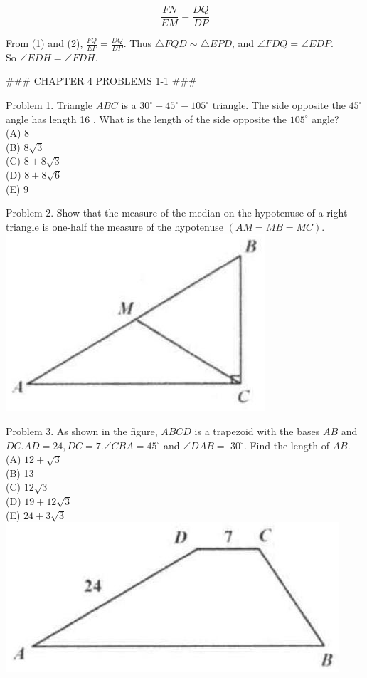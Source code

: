 \documentclass[10pt]{article}
\begin{document}
\[
\frac{F N}{E M}=\frac{D Q}{D P}
\]

From (1) and (2), \(\frac{F Q}{E P}=\frac{D Q}{D P}\). Thus \(\triangle F Q D \sim \triangle E P D\), and \(\angle F D Q=\angle E D P\).\\
So \(\angle E D H=\angle F D H\).


### CHAPTER 4 PROBLEMS 1-1 ###

Problem 1. Triangle \(A B C\) is a \(30^{\circ}-45^{\circ}-105^{\circ}\) triangle. The side opposite the \(45^{\circ}\) angle has length 16 . What is the length of the side opposite the \(105^{\circ}\) angle?\\
(A) 8\\
(B) \(8 \sqrt{3}\)\\
(C) \(8+8 \sqrt{3}\)\\
(D) \(8+8 \sqrt{6}\)\\
(E) 9

Problem 2. Show that the measure of the median on the hypotenuse of a right triangle is one-half the measure of the hypotenuse \((A M=M B=M C)\).\\
\includegraphics[max width=\textwidth, center]{2025_04_17_97bc1f7e44d93c271a88g-088(3)}

Problem 3. As shown in the figure, \(A B C D\) is a trapezoid with the bases \(A B\) and \(D C . A D=24, D C=7 . \angle C B A=45^{\circ}\) and \(\angle D A B=\) \(30^{\circ}\). Find the length of \(A B\).\\
(A) \(12+\sqrt{3}\)\\
(B) 13\\
(C) \(12 \sqrt{3}\)\\
(D) \(19+12 \sqrt{3}\)\\
(E) \(24+3 \sqrt{3}\)\\
\includegraphics[max width=\textwidth, center]{2025_04_17_97bc1f7e44d93c271a88g-088(1)}
\end{document}
